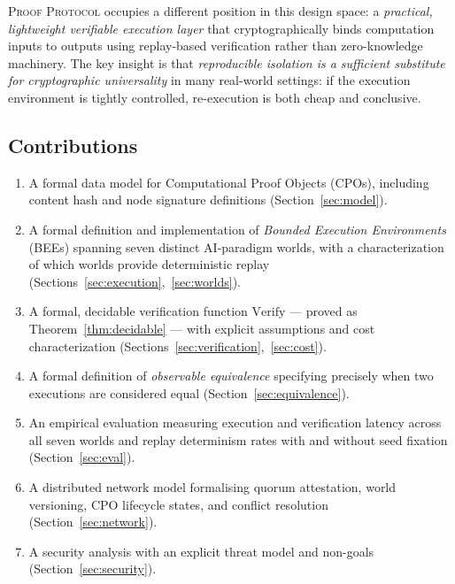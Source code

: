 \documentclass[11pt]{article}
\begin{document}
\textsc{Proof Protocol} occupies a different position in this design space:
a \emph{practical, lightweight verifiable execution layer} that
cryptographically binds computation inputs to outputs using replay-based
verification rather than zero-knowledge machinery.  The key insight is that
\emph{reproducible isolation is a sufficient substitute for cryptographic
universality} in many real-world settings: if the execution environment is
tightly controlled, re-execution is both cheap and conclusive.

\subsection*{Contributions}

\begin{enumerate}
  \item A formal data model for Computational Proof Objects (CPOs),
        including content hash and node signature definitions
        (Section~\ref{sec:model}).
  \item A formal definition and implementation of \emph{Bounded Execution
        Environments} (BEEs) spanning seven distinct AI-paradigm worlds,
        with a characterization of which worlds provide deterministic replay
        (Sections~\ref{sec:execution},~\ref{sec:worlds}).
  \item A formal, decidable verification function $\mathrm{Verify}$ — proved
        as Theorem~\ref{thm:decidable} — with explicit assumptions and cost
        characterization (Sections~\ref{sec:verification},~\ref{sec:cost}).
  \item A formal definition of \emph{observable equivalence} specifying
        precisely when two executions are considered equal
        (Section~\ref{sec:equivalence}).
  \item An empirical evaluation measuring execution and verification latency
        across all seven worlds and replay determinism rates with and without
        seed fixation (Section~\ref{sec:eval}).
  \item A distributed network model formalising quorum attestation, world
        versioning, CPO lifecycle states, and conflict resolution
        (Section~\ref{sec:network}).
  \item A security analysis with an explicit threat model and non-goals
        (Section~\ref{sec:security}).
\end{enumerate}

\end{document}
